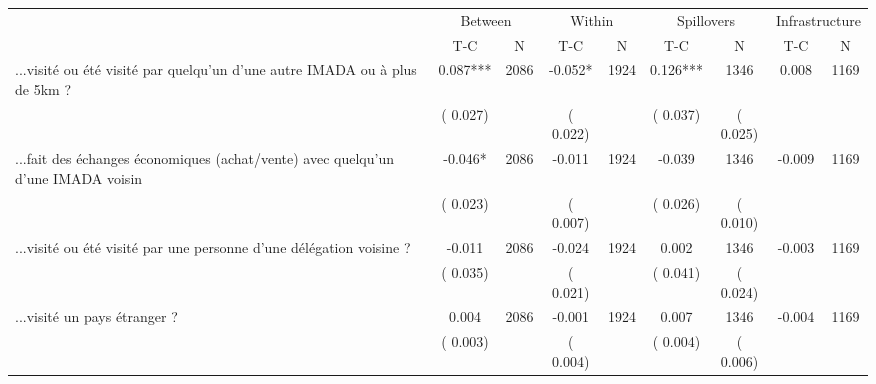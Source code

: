 
\begin{tabular}{l*{8}{c}}\hline&\multicolumn{2}{c}{Between}&\multicolumn{2}{c}{Within}&\multicolumn{2}{c}{Spillovers}&\multicolumn{2}{c}{Infrastructure}\\ \cmidrule(r){2-3}\cmidrule(l){4-5}\cmidrule(l){6-7}\cmidrule(l){8-9} & {T-C} & {N} & {T-C} & {N}  & {T-C}  & {N} & {T-C}  & {N} \\ \midrule
...visité ou été visité par quelqu'un d'une autre IMADA ou à plus de 5km ?        &              0.087***      &       2086       &             -0.052*      &       1924       &              0.126***      &       1346  &        0.008 &       1169       \\
                       &       (       0.027)            &                               &       (       0.022)            &                               &       (       0.037)            &       (       0.025) &                  \\
...fait des échanges économiques (achat/vente) avec quelqu'un d'une IMADA voisin        &             -0.046*      &       2086       &             -0.011      &       1924       &             -0.039      &       1346  &       -0.009 &       1169       \\
                       &       (       0.023)            &                               &       (       0.007)            &                               &       (       0.026)            &       (       0.010) &                  \\
...visité ou été visité par une personne d'une délégation voisine ?        &             -0.011      &       2086       &             -0.024      &       1924       &              0.002      &       1346  &       -0.003 &       1169       \\
                       &       (       0.035)            &                               &       (       0.021)            &                               &       (       0.041)            &       (       0.024) &                  \\
...visité un pays étranger ?        &              0.004      &       2086       &             -0.001      &       1924       &              0.007      &       1346  &       -0.004 &       1169       \\
                       &       (       0.003)            &                               &       (       0.004)            &                               &       (       0.004)            &       (       0.006) &                  \\
\hline \end{tabular}